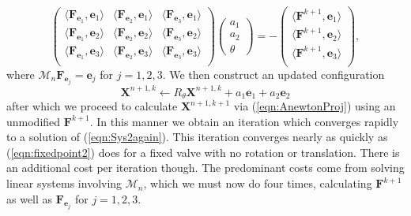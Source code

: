 \documentclass[preprint,12pt]{elsarticle}
\begin{document}
\begin{equation}
\left( \begin{array}{ccc}
\langle\mathbf{F}_{\mathbf{e}_1},\mathbf{e}_1\rangle &
\langle\mathbf{F}_{\mathbf{e}_2},\mathbf{e}_1\rangle &
\langle\mathbf{F}_{\mathbf{e}_3},\mathbf{e}_1\rangle \\
\langle\mathbf{F}_{\mathbf{e}_1},\mathbf{e}_2\rangle &
\langle\mathbf{F}_{\mathbf{e}_2},\mathbf{e}_2\rangle &
\langle\mathbf{F}_{\mathbf{e}_3},\mathbf{e}_2\rangle \\
\langle\mathbf{F}_{\mathbf{e}_1},\mathbf{e}_3\rangle &
\langle\mathbf{F}_{\mathbf{e}_2},\mathbf{e}_3\rangle &
\langle\mathbf{F}_{\mathbf{e}_3},\mathbf{e}_3\rangle \\
\end{array} \right)
\left( \begin{array}{c}
a_1 \\ a_2 \\ \theta
\end{array} \right)
=
-\left( \begin{array}{c}
\langle\mathbf{F}^{k+1},\mathbf{e}_1\rangle \\
\langle\mathbf{F}^{k+1},\mathbf{e}_2\rangle \\
\langle\mathbf{F}^{k+1},\mathbf{e}_3\rangle \\
\end{array} \right),
\end{equation}
where $\mathcal{M}_n\mathbf{F}_{\mathbf{e}_j} = \mathbf{e}_j$ for $j=1,2,3$.
We then construct an updated configuration 
\begin{equation}
\mathbf{X}^{n+1,k} \leftarrow R_{\theta}\mathbf{X}^{n+1,k}+a_1\mathbf{e}_1+a_2\mathbf{e}_2
\label{eqn:Rotate}
\end{equation}
after which we proceed to calculate $\mathbf{X}^{n+1,k+1}$ via (\ref{eqn:AnewtonProj}) using an unmodified $\mathbf{F}^{k+1}$.
In this manner we obtain an iteration which converges rapidly to a solution of (\ref{eqn:Sys2again}).
This iteration converges nearly as quickly as (\ref{eqn:fixedpoint2}) does for a fixed valve with no rotation or translation. There is an additional cost per iteration though. The predominant costs come from solving linear systems involving $\mathcal{M}_n$, which we must now do four times, calculating $\mathbf{F}^{k+1}$ as well as $\mathbf{F}_{\mathbf{e}_j}$ for $j=1,2,3$.
\end{document}
